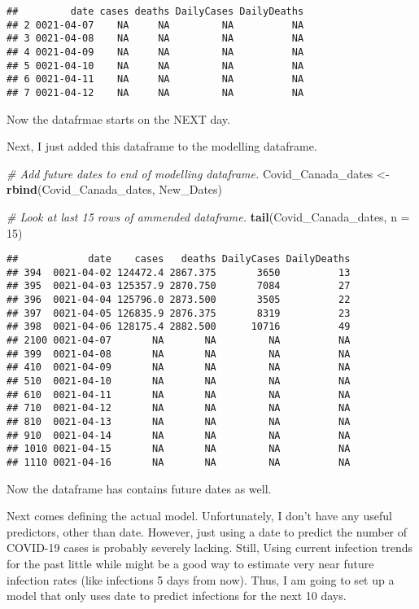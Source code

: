 \documentclass[]{tufte-handout}
\newenvironment{Shaded}{}{}
\newcommand{\CommentTok}[1]{\textcolor[rgb]{0.38,0.63,0.69}{\textit{#1}}}
\newcommand{\DataTypeTok}[1]{\textcolor[rgb]{0.56,0.13,0.00}{#1}}
\newcommand{\DecValTok}[1]{\textcolor[rgb]{0.25,0.63,0.44}{#1}}
\newcommand{\KeywordTok}[1]{\textcolor[rgb]{0.00,0.44,0.13}{\textbf{#1}}}
\newcommand{\NormalTok}[1]{#1}
\newcommand{\StringTok}[1]{\textcolor[rgb]{0.25,0.44,0.63}{#1}}
\begin{document}
\begin{verbatim}
##         date cases deaths DailyCases DailyDeaths
## 2 0021-04-07    NA     NA         NA          NA
## 3 0021-04-08    NA     NA         NA          NA
## 4 0021-04-09    NA     NA         NA          NA
## 5 0021-04-10    NA     NA         NA          NA
## 6 0021-04-11    NA     NA         NA          NA
## 7 0021-04-12    NA     NA         NA          NA
\end{verbatim}

Now the datafrmae starts on the NEXT day.

Next, I just added this dataframe to the modelling dataframe.

\begin{Shaded}
\begin{Highlighting}[]
\CommentTok{# Add future dates to end of modelling dataframe.}
\NormalTok{Covid_Canada_dates <-}\StringTok{ }\KeywordTok{rbind}\NormalTok{(Covid_Canada_dates, New_Dates)}

\CommentTok{# Look at last 15 rows of ammended dataframe.}
\KeywordTok{tail}\NormalTok{(Covid_Canada_dates, }\DataTypeTok{n =} \DecValTok{15}\NormalTok{)}
\end{Highlighting}
\end{Shaded}

\begin{verbatim}
##            date    cases   deaths DailyCases DailyDeaths
## 394  0021-04-02 124472.4 2867.375       3650          13
## 395  0021-04-03 125357.9 2870.750       7084          27
## 396  0021-04-04 125796.0 2873.500       3505          22
## 397  0021-04-05 126835.9 2876.375       8319          23
## 398  0021-04-06 128175.4 2882.500      10716          49
## 2100 0021-04-07       NA       NA         NA          NA
## 399  0021-04-08       NA       NA         NA          NA
## 410  0021-04-09       NA       NA         NA          NA
## 510  0021-04-10       NA       NA         NA          NA
## 610  0021-04-11       NA       NA         NA          NA
## 710  0021-04-12       NA       NA         NA          NA
## 810  0021-04-13       NA       NA         NA          NA
## 910  0021-04-14       NA       NA         NA          NA
## 1010 0021-04-15       NA       NA         NA          NA
## 1110 0021-04-16       NA       NA         NA          NA
\end{verbatim}

Now the dataframe has contains future dates as well.

Next comes defining the actual model. Unfortunately, I don't have any
useful predictors, other than date. However, just using a date to
predict the number of COVID-19 cases is probably severely lacking.
Still, Using current infection trends for the past little while might be
a good way to estimate very near future infection rates (like infections
5 days from now). Thus, I am going to set up a model that only uses date
to predict infections for the next 10 days.
\end{document}
